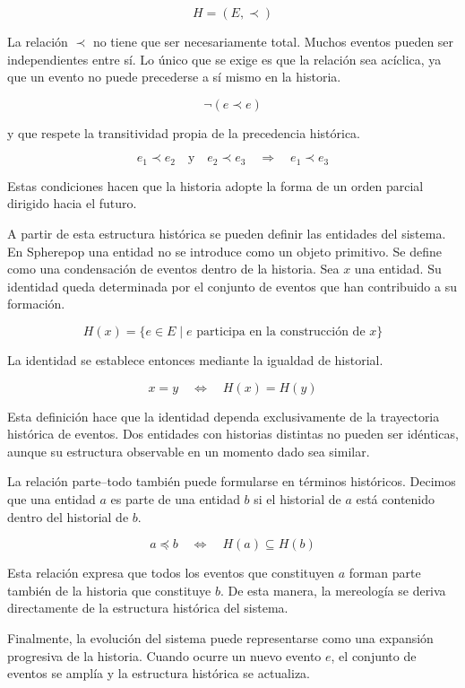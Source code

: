 \documentclass[12pt]{article}
\begin{document}
\[
H = (E, \prec)
\]

La relación \( \prec \) no tiene que ser necesariamente total. Muchos eventos pueden ser independientes entre sí. Lo único que se exige es que la relación sea acíclica, ya que un evento no puede precederse a sí mismo en la historia.

\[
\neg (e \prec e)
\]

y que respete la transitividad propia de la precedencia histórica.

\[
e_1 \prec e_2 \quad \text{y} \quad e_2 \prec e_3 \quad \Rightarrow \quad e_1 \prec e_3
\]

Estas condiciones hacen que la historia adopte la forma de un orden parcial dirigido hacia el futuro.

A partir de esta estructura histórica se pueden definir las entidades del sistema. En Spherepop una entidad no se introduce como un objeto primitivo. Se define como una condensación de eventos dentro de la historia. Sea \(x\) una entidad. Su identidad queda determinada por el conjunto de eventos que han contribuido a su formación.

\[
H(x) = \{ e \in E \mid e \text{ participa en la construcción de } x \}
\]

La identidad se establece entonces mediante la igualdad de historial.

\[
x = y \quad \Longleftrightarrow \quad H(x) = H(y)
\]

Esta definición hace que la identidad dependa exclusivamente de la trayectoria histórica de eventos. Dos entidades con historias distintas no pueden ser idénticas, aunque su estructura observable en un momento dado sea similar.

La relación parte--todo también puede formularse en términos históricos. Decimos que una entidad \(a\) es parte de una entidad \(b\) si el historial de \(a\) está contenido dentro del historial de \(b\).

\[
a \preceq b \quad \Longleftrightarrow \quad H(a) \subseteq H(b)
\]

Esta relación expresa que todos los eventos que constituyen \(a\) forman parte también de la historia que constituye \(b\). De esta manera, la mereología se deriva directamente de la estructura histórica del sistema.

Finalmente, la evolución del sistema puede representarse como una expansión progresiva de la historia. Cuando ocurre un nuevo evento \(e\), el conjunto de eventos se amplía y la estructura histórica se actualiza.
\end{document}
